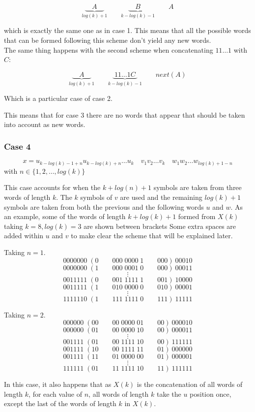 \documentclass[10pt, a4paper]{article}
\theoremstyle{definition}
\begin{document}
$$\underbrace{\quad A \quad }_{log(k) +1} \qquad \underbrace{\quad B \quad }_{k - log(k) - 1}  \qquad A$$

which is exactly the same one as in case 1. This means that all the possible words that can be formed following this scheme don't yield any new words.
\\
The same thing happens with the second scheme when concatenating $11\dots1$ with $C$:

$$\underbrace{\quad A \quad }_{log(k) +1} \qquad \underbrace{\; 11\dots1C \; }_{k - log(k) - 1}  \qquad next(A)$$

Which is a particular case of case 2.

This means that for case 3 there are no words that appear that should be taken into account as new words.


\subsubsection{Case 4}
$$ x = u_{k-log(k)-1+n} u_{k-log(k)+n} \dots u_k \quad v_1 v_2 \dots v_k \quad w_1 w_2 \dots w_{log(k)+1-n}$$
with $n \in \{1, 2, \dots , log(k)\}$

This case accounts for when the $k + log(n) + 1$ symbols are taken from three words of length $k$. The $k$ symbols of $v$ are used and the remaining $log(k) + 1$ symbols are taken from both the previous and the following words $u$ and $w$.
As an example, some of the words of length $k + log(k) + 1$ formed from $X(k)$ taking $k = 8, log(k) = 3$ are shown between brackets
Some extra spaces are added within $u$ and $v$ to make clear the scheme that will be explained later.

Taking $n = 1$.
$$0000000\; (0 \qquad 000 \; 0000 \; 1 \qquad 000) \: 00010$$
$$0000000\; (1 \qquad 000 \; 0001 \; 0 \qquad 000) \: 00011$$
$$\vdots$$
$$0011111\; (0 \qquad 001 \; 1111 \; 1 \qquad 001) \: 10000$$
$$0011111\; (1 \qquad 010 \; 0000 \; 0 \qquad 010) \: 00001$$
$$\vdots$$
$$1111110\; (1 \qquad 111 \; 1111 \; 0 \qquad 111) \: 11111$$

Taking $n = 2$.
$$000000\; (00 \qquad 00 \; 0000 \; 01 \qquad 00) \: 000010$$
$$000000\; (01 \qquad 00 \; 0000 \; 10 \qquad 00) \: 000011$$
$$\vdots$$
$$001111\; (01 \qquad 00 \; 1111 \; 10 \qquad 00) \: 111111$$
$$001111\; (10 \qquad 00 \; 1111 \; 11 \qquad 01) \: 000000$$
$$001111\; (11 \qquad 01 \; 0000 \; 00 \qquad 01) \: 000001$$
$$\vdots$$
$$111111\; (01 \qquad 11 \; 1111 \; 10 \qquad 11) \: 111111$$

In this case, it also happens that as $X(k)$ is the concatenation of all words of length $k$, for each value of $n$, 
all words of length $k$ take the $u$ position once, except the last of the words of length $k$ in $X(k)$.
\end{document}
